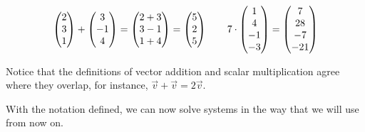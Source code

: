 \begin{example}
\begin{equation*}
  \begin{pmatrix} 2 \\ 3 \\ 1 \end{pmatrix}
   +
  \begin{pmatrix} 3 \\ -1 \\ 4 \end{pmatrix}
  =
  \begin{pmatrix} 2+3 \\ 3-1 \\ 1+4 \end{pmatrix}
   =
  \begin{pmatrix} 5 \\ 2 \\ 5 \end{pmatrix}
  \qquad
  7\cdot\begin{pmatrix} 1 \\ 4 \\ -1 \\ -3 \end{pmatrix}
  =
  \begin{pmatrix} 7 \\ 28 \\ -7 \\ -21 \end{pmatrix}
\end{equation*}
\end{example}

Notice that the definitions of vector addition and scalar multiplication agree
where they overlap, for instance, \( \vec{v} +\vec{v} = 2\vec{v} \).

With the notation defined, we can now solve systems in the way 
that we will use from now on.

